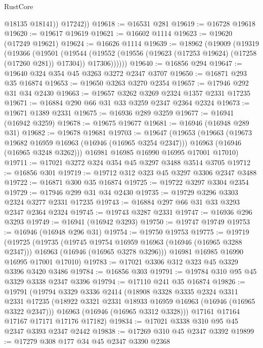 \begin{lexlean}{RustCore}
\begin{coremodule}
            @18135
            @18141))
        @17242))
@19618 := @16531 @281
@19619 := @16728 @19618
@19620 := @19617 @19619
@19621 := @16602 @1114
@19623 := @19620 (@17249 @19621)
@19624 := @16626 @1114
@19639 := @18962
    (@19009
      (@19319
        (@19366
          (@19501
            (@19544
              (@19552 (@19556 (@19623 (@17253 @19624) (@17258 (@17260 @281)) @17304)) @17306))))))
@19640 := @16856 @294
@19647 := @19640 @324 @354 @45 @3263 @3272 @2347 @3707
@19650 := @16871 @293 @35 @16874
@19653 := @19650 @3263 @3270 @2354
@19657 := @17946 @292 @31 @34 @2430
@19663 := @19657 @3262 @3269 @2324 @1357 @2331 @17235
@19671 := @16884 @290 @66 @31 @33 @3259 @2347 @2364 @2324
@19673 := @19671 @1389 @2331
@19675 := @16936 @289 @3259
@19677 := @16941 (@16942 @3259)
@19678 := @19675 @19677
@19681 := @16946 (@16948 @289 @31)
@19682 := @19678 @19681
@19703 := @19647
    (@19653
      (@19663
        (@19673 @19682 @16959 @16963 (@16946 (@16965 @3254 @2347)))
        @16963
        (@16946 (@16965 @3248 @3262)))
      @16981
      @16985
      @16990
      @16995
      @17001
      @17010)
@19711 := @17021 @3272 @324 @354 @45 @3297 @3488 @3514 @3705
@19712 := @16856 @301
@19719 := @19712 @312 @323 @45 @3297 @3306 @2347 @3488
@19722 := @16871 @300 @35 @16874
@19725 := @19722 @3297 @3304 @2354
@19729 := @17946 @299 @31 @34 @2430
@19735 := @19729 @3296 @3303 @2324 @3277 @2331 @17235
@19743 := @16884 @297 @66 @31 @33 @3293 @2347 @2364 @2324
@19745 := @19743 @3287 @2331
@19747 := @16936 @296 @3293
@19749 := @16941 (@16942 @3293)
@19750 := @19747 @19749
@19753 := @16946 (@16948 @296 @31)
@19754 := @19750 @19753
@19775 := @19719
    (@19725
      (@19735
        (@19745 @19754 @16959 @16963 (@16946 (@16965 @3288 @2347)))
        @16963
        (@16946 (@16965 @3278 @3296)))
      @16981
      @16985
      @16990
      @16995
      @17001
      @17010)
@19783 := @17021 @3306 @312 @323 @45 @3329 @3396 @3420 @3486
@19784 := @16856 @303
@19791 := @19784 @310 @95 @45 @3329 @3338 @2347 @3396
@19794 := @17110 @241 @35 @16874
@19826 := @19791
    (@19794
      @3329
      @3336
      @2414
      (@18908
        @3328
        @3335
        @2324
        @3311
        @2331
        @17235
        (@18922 @3321 @2331 @18933 @16959 @16963 (@16946 (@16965 @3322 @2347)))
        @16963
        (@16946 (@16965 @3312 @3328)))
      @17161
      @17164
      @17167
      @17171
      @17176
      @17182)
@19834 := @17021 @3338 @310 @95 @45 @2347 @3393 @2347 @2442
@19838 := @17269 @310 @45 @2347 @3392
@19899 := @17279
    @308
    @177
    @34
    @45
    @2347
    @3390
    @2368

\end{coremodule}
\end{lexlean}
